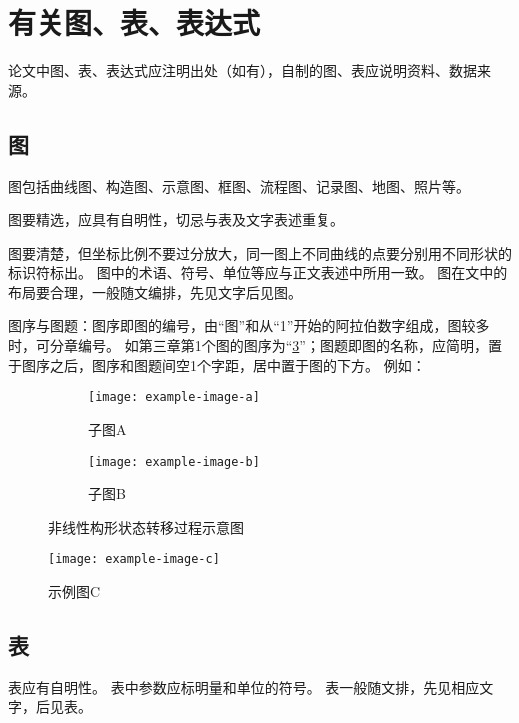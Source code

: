 \section{有关图、表、表达式}

论文中图、表、表达式应注明出处（如有），自制的图、表应说明资料、数据来源。

\subsection{图}

图包括曲线图、构造图、示意图、框图、流程图、记录图、地图、照片等。

图要精选，应具有自明性，切忌与表及文字表述重复。

图要清楚，但坐标比例不要过分放大，同一图上不同曲线的点要分别用不同形状的标识符标出。
图中的术语、符号、单位等应与正文表述中所用一致。
图在文中的布局要合理，一般随文编排，先见文字后见图。

图序与图题：图序即图的编号，由“图”和从“1”开始的阿拉伯数字组成，图较多时，可分章编号。
如第三章第1个图的图序为“\ref{fig:example}”；图题即图的名称，应简明，置于图序之后，图序和图题间空1个字距，居中置于图的下方。
例如：

\begin{figure}[H]
    \centering
    \begin{subfigure}[b]{0.4\linewidth}
        \centering
        \texttt{[image: example-image-a]}
        \caption{子图A}
        \label{fig:example-a}
    \end{subfigure}
    \quad
    \begin{subfigure}[b]{0.4\linewidth}
        \centering
        \texttt{[image: example-image-b]}
        \caption{子图B}
        \label{fig:example-b}
    \end{subfigure}
    \caption{非线性构形状态转移过程示意图}
    \label{fig:example}
\end{figure}

\begin{figure}[H]
    \centering
    \texttt{[image: example-image-c]}
    \caption{示例图C}
    \label{fig:example-c}
\end{figure}

\subsection{表}

表应有自明性。
表中参数应标明量和单位的符号。
表一般随文排，先见相应文字，后见表。

